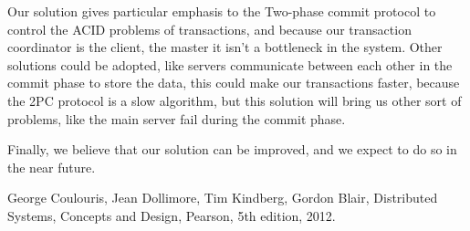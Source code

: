 \documentclass[times, 10pt,twocolumn]{article}
\begin{document}
Our solution gives particular emphasis to the Two-phase commit protocol to control the ACID problems of transactions, and because our transaction coordinator is the client, the master it isn't a bottleneck in the system. Other solutions could be adopted, like servers communicate between each other in the commit phase to store the data, this could make our transactions faster, because the 2PC protocol is a slow algorithm, but this solution will bring us other sort of problems, like the main server fail during the commit phase.

Finally, we believe that our solution can be improved, and we expect to do so in the near future.





\begin{thebibliography}{9}
 
George Coulouris, Jean Dollimore, Tim Kindberg, Gordon Blair,
   Distributed Systems, Concepts and Design, 
   Pearson,
   5th edition,
   2012.

\end{thebibliography}
\end{document}
